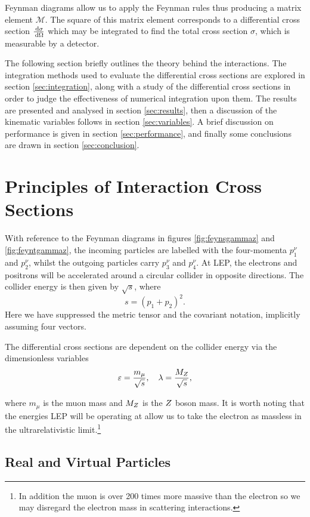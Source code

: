 \documentclass[]{article}
\begin{document}
Feynman diagrams allow us to apply the Feynman rules thus producing a  matrix element $\mathcal{M}$. The square of this matrix element corresponds to a differential cross section $\frac{\,\operatorname{d}\!{\sigma}}{\,\operatorname{d}\!{\Omega}}$ which may be integrated to find the total cross section $\sigma$, which is measurable by a detector.

The following section briefly outlines the theory behind the interactions. The integration methods used to evaluate the differential cross sections are explored in section \ref{sec:integration}, along with a study of the differential cross sections in order to judge the effectiveness of numerical integration upon them. The results are presented and analysed in section \ref{sec:results}, then a discussion of the kinematic variables follows in section \ref{sec:variables}. A brief discussion on performance is given in section \ref{sec:performance}, and finally some conclusions are drawn in section \ref{sec:conclusion}.

\section{Principles of Interaction Cross Sections}

With reference to the Feynman diagrams in figures \ref{fig:feynsgammaz} and \ref{fig:feyntgammaz}, the incoming particles are labelled with the four-momenta $p_{1}^{\nu}$ and $p_{2}^{\nu}$, whilst the outgoing particles carry $p_{3}^{\nu}$ and $p_{4}^{\nu}$. At LEP, the electrons and positrons will be accelerated around a circular collider in opposite directions. The collider energy is then given by $\sqrt{s}$, where $$s = (p_{1} + p_{2})^{2}.$$ Here we have suppressed the metric tensor and the covariant notation, implicitly assuming four vectors.

The differential cross sections are dependent on the collider energy via the dimensionless variables $$\varepsilon = \frac{m_{\mu}}{\sqrt{s}}, \quad \lambda = \frac{M_{Z }}{\sqrt{s}},$$

where $m_{\mu}$ is the muon mass and $M_{Z }$ is the $Z $ boson mass. It is worth noting that the energies LEP will be operating at allow us to take the electron as massless in the ultrarelativistic limit.\footnote{In addition the muon is over 200 times more massive than the electron so we may disregard the electron mass in scattering interactions.}

\subsection{Real and Virtual Particles}
\end{document}
